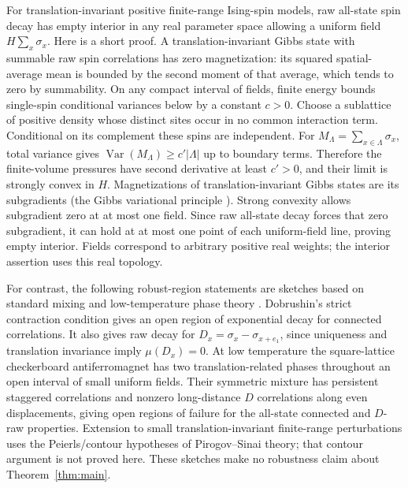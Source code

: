 \begin{remark}\label{rem:robust}
For translation-invariant positive finite-range Ising-spin models, raw all-state spin decay has empty interior in any real parameter space allowing a uniform field $H\sum_x\sigma_x$. Here is a short proof. A translation-invariant Gibbs state with summable raw spin correlations has zero magnetization: its squared spatial-average mean is bounded by the second moment of that average, which tends to zero by summability. On any compact interval of fields, finite energy bounds single-spin conditional variances below by a constant $c>0$. Choose a sublattice of positive density whose distinct sites occur in no common interaction term. Conditional on its complement these spins are independent. For $M_\Lambda=\sum_{x\in\Lambda}\sigma_x$, total variance gives
$\operatorname{Var}(M_\Lambda)\ge c'|\Lambda|$ up to boundary terms. Therefore the finite-volume pressures have second derivative at least $c'>0$, and their limit is strongly convex in $H$. Magnetizations of translation-invariant Gibbs states are its subgradients (the Gibbs variational principle \cite[Chapter 15]{Georgii}). Strong convexity allows subgradient zero at at most one field. Since raw all-state decay forces that zero subgradient, it can hold at at most one point of each uniform-field line, proving empty interior. Fields correspond to arbitrary positive real weights; the interior assertion uses this real topology.

For contrast, the following robust-region statements are sketches based on standard mixing and low-temperature phase theory \cite[Chapters 6--7]{FV}. Dobrushin's strict contraction condition gives an open region of exponential decay for connected correlations. It also gives raw decay for $D_x=\sigma_x-\sigma_{x+e_1}$, since uniqueness and translation invariance imply $\mu(D_x)=0$. At low temperature the square-lattice checkerboard antiferromagnet has two translation-related phases throughout an open interval of small uniform fields. Their symmetric mixture has persistent staggered correlations and nonzero long-distance $D$ correlations along even displacements, giving open regions of failure for the all-state connected and $D$-raw properties. Extension to small translation-invariant finite-range perturbations uses the Peierls/contour hypotheses of Pirogov--Sinai theory; that contour argument is not proved here. These sketches make no robustness claim about Theorem~\ref{thm:main}.
\end{remark}

